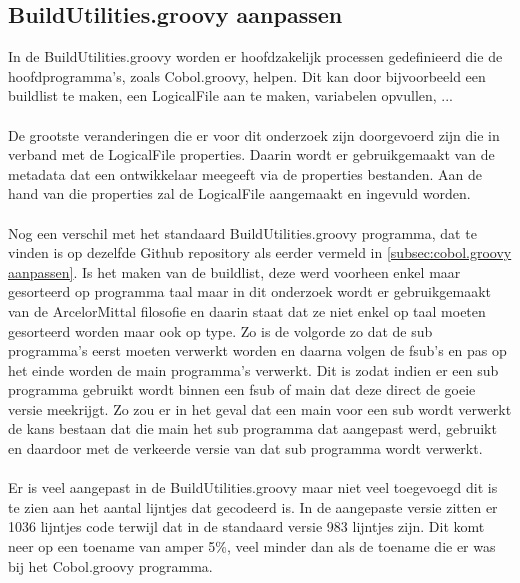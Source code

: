 \subsection{BuildUtilities.groovy aanpassen}
In de BuildUtilities.groovy worden er hoofdzakelijk processen gedefinieerd die de hoofdprogramma's, zoals Cobol.groovy, helpen. Dit kan door bijvoorbeeld een buildlist te maken, een LogicalFile aan te maken, variabelen opvullen, ...
\\ \\
De grootste veranderingen die er voor dit onderzoek zijn doorgevoerd zijn die in verband met de LogicalFile properties. Daarin wordt er gebruikgemaakt van de metadata dat een ontwikkelaar meegeeft via de properties bestanden. Aan de hand van die properties zal de LogicalFile aangemaakt en ingevuld worden.
\\ \\
Nog een verschil met het standaard BuildUtilities.groovy programma, dat te vinden is op dezelfde Github repository als eerder vermeld in \ref{subsec:cobol.groovy aanpassen}. Is het maken van de buildlist, deze werd voorheen enkel maar gesorteerd op programma taal maar in dit onderzoek wordt er gebruikgemaakt van de ArcelorMittal filosofie en daarin staat dat ze niet enkel op taal moeten gesorteerd worden maar ook op type. Zo is de volgorde zo dat de sub programma's eerst moeten verwerkt worden en daarna volgen de fsub's en pas op het einde worden de main programma's verwerkt. Dit is zodat indien er een sub programma gebruikt wordt binnen een fsub of main dat deze direct de goeie versie meekrijgt. Zo zou er in het geval dat een main voor een sub wordt verwerkt de kans bestaan dat die main het sub programma dat aangepast werd, gebruikt en daardoor met de verkeerde versie van dat sub programma wordt verwerkt. 
\\ \\
Er is veel aangepast in de BuildUtilities.groovy maar niet veel toegevoegd dit is te zien aan het aantal lijntjes dat gecodeerd is. In de aangepaste versie zitten er 1036 lijntjes code terwijl dat in de standaard versie 983 lijntjes zijn. Dit komt neer op een toename van amper 5\%, veel minder dan als de toename die er was bij het Cobol.groovy programma. 

